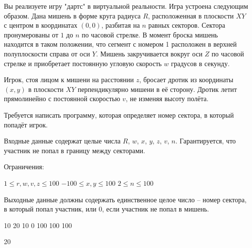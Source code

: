 
Вы реализуете игру "дартс" \: в виртуальной реальности. Игра устроена следующим образом. Дана мишень в форме круга радиуса $R$, расположенная в плоскости $XY$ с центром в координатах $(0, 0)$, разбитая на $n$ равных секторов. Сектора пронумерованы от $1$ до $n$ по часовой стрелке. В момент броска мишень находится в таком положении, что сегмент с номером 1 расположен в верхней полуплоскости справа от оси $Y$. Мишень закручивается вокруг оси $Z$ по часовой стрелке и приобретает постоянную угловую скорость $w$ градусов в секунду. 

Игрок, стоя лицом к мишени на расстоянии $z$, бросает дротик из координаты $(x, y)$ в плоскости $XY$ перпендикулярно мишени в её сторону. Дротик летит прямолинейно с постоянной скоростью $v$, не изменяя высоту полёта.

Требуется написать программу, которая определяет номер сектора, в который попадёт игрок.


Входные данные содержат целые числа $R$, $w$, $x$, $y$, $z$, $v$, $n$. Гарантируется, что участник не попал в границу между секторами.

Ограничения:

$1 \le r, w, v, z \le 100$
$-100 \le x, y \le 100$
$2 \le n \le 100 $

\outputfmtSection

Выходные данные должны содержать единственное целое число -- номер сектора, в который попал участник, или 0, если участник не попал в мишень.


\begin{myverbbox}[\small]{\vinput}
    10 20 10 0 100 100 100
\end{myverbbox}
\begin{myverbbox}[\small]{\voutput}
    20
\end{myverbbox}

